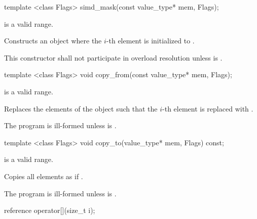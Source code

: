\begin{itemdecl}
template <class Flags> simd_mask(const value_type* mem, Flags);
\end{itemdecl}
\begin{itemdescr}
  \flagsRequires{\mask{}}
  \code{[mem, mem + size())} is a valid range.

  \pnum\effects Constructs an object where the $i$-th element is initialized to  \foralli.

  \pnum\remarks This constructor shall not participate in overload resolution unless  is \true.
\end{itemdescr}

\begin{itemdecl}
template <class Flags> void copy_from(const value_type* mem, Flags);
\end{itemdecl}
\begin{itemdescr}
  \flagsRequires{\mask{}}
  \code{[mem, mem + size())} is a valid range.

  \pnum\effects Replaces the elements of the \mask object such that the $i$-th element is replaced with  \foralli.

  \pnum\remarks The program is ill-formed unless  is \true.
\end{itemdescr}

\begin{itemdecl}
template <class Flags> void copy_to(value_type* mem, Flags) const;
\end{itemdecl}
\begin{itemdescr}
  \flagsRequires{\mask{}}
  \code{[mem, mem + size())} is a valid range.

  \pnum\effects Copies all \mask elements as if  \foralli.

  \pnum\remarks The program is ill-formed unless  is \true.
\end{itemdescr}

\begin{itemdecl}
reference operator[](size_t i);
\end{itemdecl}
\begin{itemdescr}
  \simdElementReference{\mask{}}
\end{itemdescr}


